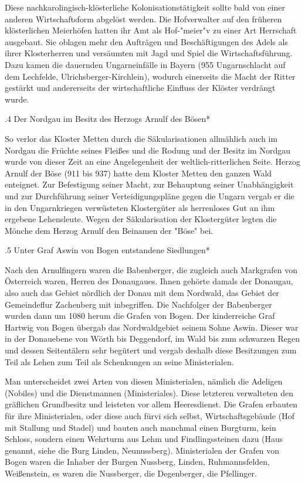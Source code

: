 Diese nachkarolingisch-klösterliche Kolonisationstätigkeit sollte bald von einer
anderen Wirtschaftsform abgelöst werden. Die Hofverwalter auf den früheren
klösterlichen Meierhöfen hatten ihr Amt als Hof-"meier"v zu einer Art Herrschaft
ausgebaut. Sie oblagen mehr den Aufträgen und Beschäftigungen des Adels als
ihrer Klosterherren und versäumten mit Jagd und Spiel die Wirtschaftsführung.
Dazu kamen die dauernden Ungarneinfälle in Bayern (955 Ungarnschlacht auf dem
Lechfelde, Ulrichsberger-Kirchlein), wodurch einerseits die Macht der Ritter
gestärkt und andererseits der wirtschaftliche Einfluss der Klöster verdrängt
wurde.

.4 Der Nordgau im Besitz des Herzogs Arnulf des Bösen*

So verlor das Kloster Metten durch die Säkularisationen allmählich auch im
Nordgau die Früchte seines Fleißes und die Rodung und der Besitz im Nordgau
wurde von dieser Zeit an eine Angelegenheit der weltlich-ritterlichen Seite.
Herzog Arnulf der Böse (911 bis 937) hatte dem Kloster Metten den ganzen Wald
enteignet. Zur Befestigung seiner Macht, zur Behauptung seiner Unabhängigkeit
und zur Durchführung seiner Verteidigungspläne gegen die Ungarn vergab er die in
den Ungarnkriegen verwüsteten Klostergüter als herrenloses Gut an ihm ergebene
Lehensleute. Wegen der Säkularisation der Klostergüter legten die Mönche dem
Herzog Arnulf den Beinamen der "Böse" bei.

.5 Unter Graf Aswin von Bogen entstandene Siedlungen*

Nach den Arnulfingern waren die Babenberger, die zugleich auch Markgrafen von
Österreich waren, Herren des Donaugaues. Ihnen gehörte damals der Donaugau, also
auch das Gebiet nördlich der Donau mit dem Nordwald, das Gebiet der Gemeindeflur
Zachenberg mit inbegriffen. Die Nachfolger der Babenberger wurden dann um 1080
herum die Grafen von Bogen. Der kinderreiche Graf Hartwig von Bogen übergab das
Nordwaldgebiet seinem Sohne Aswin. Dieser war in der Donauebene von Wörth bis
Deggendorf, im Wald bis zum schwarzen Regen und dessen Seitentälern sehr
begütert und vergab deshalb diese Besitzungen zum Teil als Lehen zum Teil als
Schenkungen an seine Ministerialen.

Man unterscheidet zwei Arten von diesen Ministerialen, nämlich die Adeligen
(Nobiles) und die Dienstmannen (Ministeriales). Diese letzteren verwalteten den
gräflichen Grundbesitz und leisteten vor allem Heeresdienst. Die Grafen erbauten
für ihre Ministerialen, oder diese auch fürvi sich selbst, Wirtschaftsgebäude
(Hof mit Stallung und Stadel) und bauten auch manchmal einen Burgturm, kein
Schloss, sondern einen Wehrturm aus Lehm und Findlingssteinen dazu (Haus
genannt, siehe die Burg Linden, Neunussberg). Ministerialen der Grafen von Bogen
waren die Inhaber der Burgen Nussberg, Linden, Ruhmannsfelden, Weißenstein, es
waren die Nussberger, die Degenberger, die Pfellinger.

